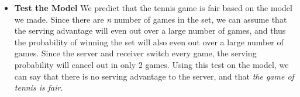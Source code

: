\documentclass[12pt]{article}
\begin{document}
\begin{itemize}
\item \textbf{Test the Model} We predict that the tennis game is fair based on the model we made. Since there are \emph{n} number of games in the set, we can assume that the serving advantage will even out over a large number of games, and thus the probability of winning the set will also even out over a large number of games. Since the server and receiver switch every game, the serving probability will cancel out in only 2 games. Using this test on the model, we can say that there is no serving advantage to the server, and that \emph{the game of tennis is fair.}
\end{itemize}
\end{document}
